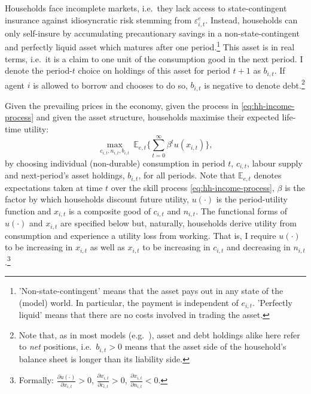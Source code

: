 \documentclass[a4paper,12pt]{article} %
\numberwithin{equation}{section} %
\numberwithin{figure}{section}
\numberwithin{table}{section}
\begin{document}
Households face incomplete markets, i.e.~they lack access to state-contingent insurance against idiosyncratic risk stemming from $\varepsilon^e_{i,t}$. Instead, households can only self-insure by accumulating precautionary savings in a non-state-contingent and perfectly liquid asset which matures after one period.\footnote{'Non-state-contingent' means that the asset pays out in any state of the (model) world. In particular, the payment is independent of $e_{i,t}$. 'Perfectly liquid' means that there are no costs involved in trading the asset.} This asset is in real terms, i.e.~it is a claim to one unit of the consumption good in the next period. I denote the period-$t$ choice on holdings of this asset for period $t+1$ as $b_{i,t}$. If agent $i$ is allowed to borrow and chooses to do so, $b_{i,t}$ is negative to denote debt.\footnote{Note that, as in most models (e.g.~\cite{kaplan2018}), asset and debt holdings alike here refer to \textit{net} positions, i.e.~$b_{i,t} > 0$ means that the asset side of the household's balance sheet is longer than its liability side.} %

Given the prevailing prices in the economy, given the process in \eqref{eq:hh-income-process} and given the asset structure, households maximise their expected life-time utility:
\begin{equation}
    \max_{c_{i,t}, n_{i,t}, b_{i,t}} \ \mathbb{E}_{e,t} \Bigg\{ \sum_{t=0}^{\infty} \beta^t u(x_{i,t}) \Bigg\}, \label{eq:hh-objective}
\end{equation}
by choosing individual (non-durable) consumption in period $t$, $c_{i,t}$, labour supply and next-period's asset holdings, $b_{i,t}$, for all periods. Note that $\mathbb{E}_{e,t}$ denotes expectations taken at time $t$ over the skill process \eqref{eq:hh-income-process}, $\beta$ is the factor by which households discount future utility, $u( \cdot )$ is the period-utility function and $x_{i,t}$ is a composite good of $c_{i,t}$ and $n_{i,t}$. The functional forms of $u( \cdot )$ and $x_{i,t}$ are specified below but, naturally, households derive utility from consumption and experience a utility loss from working. That is, I require $u( \cdot )$ to be increasing in $x_{i,t}$ as well as $x_{i,t}$ to be increasing in $c_{i,t}$ and decreasing in $n_{i,t}$.\footnote{Formally: $\frac{\partial u( \cdot )}{\partial x_{i,t}} > 0$, $\frac{\partial x_{i,t}}{\partial c_{i,t}} > 0$, $\frac{\partial x_{i,t}}{\partial n_{i,t}} < 0$.}
\end{document}
